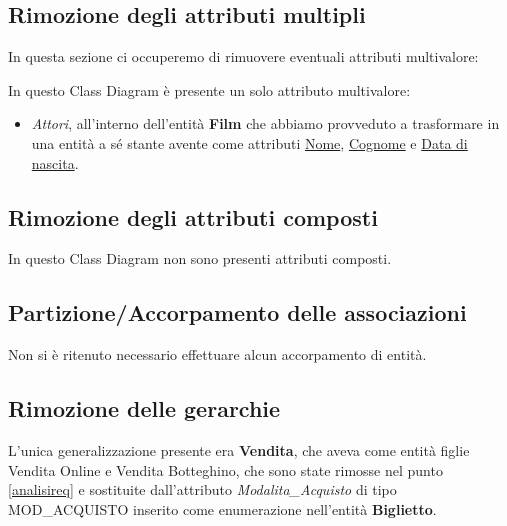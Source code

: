  
 
        \subsection{Rimozione degli attributi multipli}
            In questa sezione ci occuperemo di rimuovere eventuali attributi multivalore:
            
            In questo Class Diagram è presente un solo attributo multivalore:
            
            \begin{itemize}
                \item \textit{Attori}, all'interno dell'entità \textbf{Film} che abbiamo provveduto a trasformare in una entità a sé stante avente come attributi \underline{Nome}, \underline{Cognome} e \underline{Data di nascita}.
            \end{itemize}
            
            
            
        \subsection{Rimozione degli attributi composti}
        
        In questo Class Diagram non sono presenti attributi composti.
        
            
        \subsection{Partizione/Accorpamento delle associazioni}
        Non si è ritenuto necessario effettuare alcun accorpamento di entità.
            
        
        
        \subsection{Rimozione delle gerarchie}
    
    L'unica generalizzazione presente era
        \textbf{Vendita}, che aveva come entità figlie Vendita Online e Vendita Botteghino, che sono state rimosse nel punto \ref{analisireq} e sostituite dall'attributo \textit{Modalita\_Acquisto} di tipo MOD\_ACQUISTO inserito come enumerazione nell'entità \textbf{Biglietto}.
        
    
